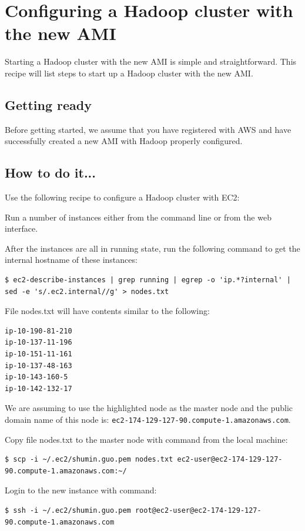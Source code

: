 \section{Configuring a Hadoop cluster with the new AMI}
Starting a Hadoop cluster with the new AMI is simple and straightforward. This recipe will list steps to start up a Hadoop cluster with the new AMI.
\subsection*{Getting ready}
Before getting started, we assume that you have registered with AWS and have successfully created a new AMI with Hadoop properly configured.
\subsection*{How to do it...}
Use the following recipe to configure a Hadoop cluster with EC2:

Run a number of instances either from the command line or from the web interface.

After the instances are all in running state, run the following command to get the internal hostname of these instances:
\lstset{style=bashstyle}
\begin{lstlisting}
$ ec2-describe-instances | grep running | egrep -o 'ip.*?internal' | sed -e 's/.ec2.internal//g' > nodes.txt
\end{lstlisting}

File nodes.txt will have contents similar to the following:
\lstset{style=bashstyle}
\begin{lstlisting}
ip-10-190-81-210
ip-10-137-11-196
ip-10-151-11-161
ip-10-137-48-163
ip-10-143-160-5
ip-10-142-132-17
\end{lstlisting}

We are assuming to use the highlighted node as the master node and the public domain name of this node is: \verb|ec2-174-129-127-90.compute-1.amazonaws.com|.

Copy file nodes.txt to the master node with command from the local machine:
\lstset{style=bashstyle}
\begin{lstlisting}
$ scp -i ~/.ec2/shumin.guo.pem nodes.txt ec2-user@ec2-174-129-127-90.compute-1.amazonaws.com:~/
\end{lstlisting}
Login to the new instance with command:
\lstset{style=bashstyle}
\begin{lstlisting}
$ ssh -i ~/.ec2/shumin.guo.pem root@ec2-user@ec2-174-129-127-90.compute-1.amazonaws.com
\end{lstlisting}

